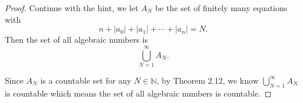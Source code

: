 \begin{Exercise}
\begin{proof}
Continue with the hint, we let $A_N$ be the set of finitely many equations with
$$
n+|a_0|+|a_1|+\cdots+|a_n| = N.
$$
Then the set of all algebraic numbers is 
$$
\bigcup_{N=1}^{\infty}A_N.
$$

Since $A_N$ is a countable set for any $N\in\mathbb{N}$, by Theorem 2.12, we know $\bigcup_{N=1}^{\infty}A_N$ is countable which means the set of all algebraic numbers is countable.
\end{proof}
\end{Exercise}